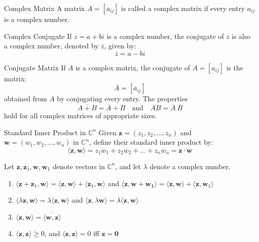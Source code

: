 \documentclass[12pt]{article}
\begin{document}
\begin{definition}{Complex Matrix}{}
    A matrix $ A = \left[ a_{ij} \right] $ is called a complex matrix if every entry $ a_{ij} $ is a complex number.
\end{definition}

\begin{definition}{Complex Conjugate}{}
    If $ z = a + bi $ is a complex number, the conjugate of $ z $ is also a complex number, denoted by $ \overline{z} $, given by:
    \[ \overline{z} = a - bi \]
\end{definition}

\begin{definition}{Conjugate Matrix}{}
    If $ A $ is a complex matrix, the conjugate of $ A = \left[ a_{ij} \right] $ is the matrix:
    \[ \overline{A} = \left[ \overline{a}_{ij} \right] \]
    obtained from $ A $ by conjugating every entry.
    \medskip
    \newline
    The properties
    \[ \overline{A + B} = \overline{A} + \overline{B} \quad \text{and} \quad \overline{AB} = \overline{A} \  \overline{B}\]
    hold for all complex matrices of appropriate sizes.
\end{definition}

\begin{definition}{Standard Inner Product in $ \mathbb{C}^n $}{}
    Given $ \mathbf{z} = \left( z_1, z_2, \dots, z_n \right) $ and $ \mathbf{w} = \left( w_1, w_2, \dots, w_n \right) $ in $ \mathbb{C}^n $, define their standard inner product by:
    \[ \langle \mathbf{z}, \mathbf{w} \rangle = z_1 \overline{w}_1 + z_2 \overline{w}_2  + \dots + z_n \overline{w}_n  = \mathbf{z} \cdot \overline{\mathbf{w}} \]
\end{definition}

\begin{theorem}{}{}
    Let $ \mathbf{z}, \mathbf{z}_1, \mathbf{w}, \mathbf{w}_1 $ denote vectors in $ \mathbb{C}^n $, and let $ \lambda $ denote a complex number.
    \begin{enumerate}[label=(\roman*)]
        \item $ \langle \mathbf{z} + \mathbf{z}_1, \mathbf{w} \rangle = \langle \mathbf{z}, \mathbf{w} \rangle + \langle \mathbf{z}_1, \mathbf{w} \rangle $ and $ \langle \mathbf{z}, \mathbf{w} + \mathbf{w_1} \rangle = \langle \mathbf{z}, \mathbf{w} \rangle + \langle \mathbf{z}, \mathbf{w}_1 \rangle $
        \item $ \langle \lambda \mathbf{z}, \mathbf{w} \rangle = \lambda \langle \mathbf{z}, \mathbf{w} \rangle $ and $ \langle \mathbf{z}, \lambda \mathbf{w} \rangle = \overline{\lambda} \langle \mathbf{z}, \mathbf{w} \rangle $
        \item $ \langle \mathbf{z}, \mathbf{w} \rangle = \overline{\langle \mathbf{w}, \mathbf{z} \rangle} $
        \item $ \langle \mathbf{z}, \mathbf{z} \rangle \geq 0 $, and $ \langle \mathbf{z}, \mathbf{z} \rangle = 0 $ iff $ \mathbf{z} = \mathbf{0} $
    \end{enumerate}
\end{theorem}
\end{document}
